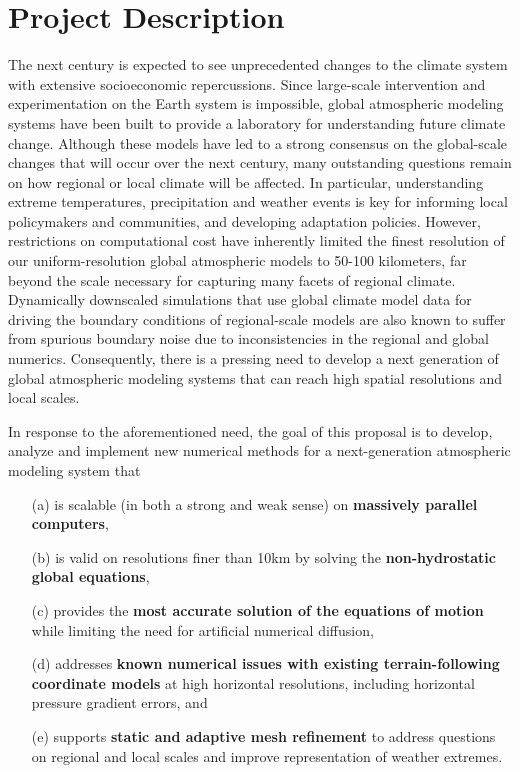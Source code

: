 \documentclass[11pt]{article}
\begin{document}
\appendix

\addtocounter{section}{3}
 
\section{Project Description}


The next century is expected to see unprecedented changes to the climate system with extensive socioeconomic repercussions.  Since large-scale intervention and experimentation on the Earth system is impossible, global atmospheric modeling systems have been built to provide a laboratory for understanding future climate change.  Although these models have led to a strong consensus on the global-scale changes that will occur over the next century, many outstanding questions remain on how regional or local climate will be affected.  In particular, understanding extreme temperatures, precipitation and weather events is key for informing local policymakers and communities, and developing adaptation policies.  However, restrictions on computational cost have inherently limited the finest resolution of our uniform-resolution global atmospheric models to 50-100 kilometers, far beyond the scale necessary for capturing many facets of regional climate.  Dynamically downscaled simulations that use global climate model data for driving the boundary conditions of regional-scale models are also known to suffer from spurious boundary noise due to inconsistencies in the regional and global numerics.  Consequently, there is a pressing need to develop a next generation of global atmospheric modeling systems that can reach high spatial resolutions and local scales.

In response to the aforementioned need, the goal of this proposal is to develop, analyze and implement new numerical methods for a next-generation atmospheric modeling system that
\vspace{-0.4cm}
\begin{enumerate}
\item[(a)] is scalable (in both a strong and weak sense) on \textbf{massively parallel computers},
\item[(b)] is valid on resolutions finer than 10km by solving the \textbf{non-hydrostatic global equations},
\item[(c)] provides the \textbf{most accurate solution of the equations of motion} while limiting the need for artificial numerical diffusion,
\item[(d)] addresses \textbf{known numerical issues with existing terrain-following coordinate models} at high horizontal resolutions, including horizontal pressure gradient errors, and
\item[(e)] supports \textbf{static and adaptive mesh refinement} to address questions on regional and local scales and improve representation of weather extremes.
\end{enumerate}
\end{document}
